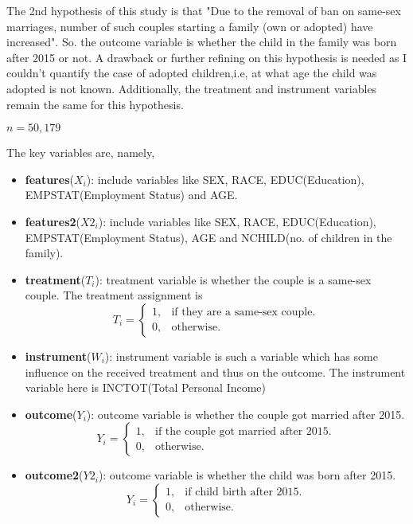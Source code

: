 \documentclass[11pt, a4paper, leqno]{article}
\begin{document}
The 2nd hypothesis of this study is that "Due to the removal of ban on same-sex marriages, number of such couples starting a family (own or 
adopted) have increased". So. the outcome variable is whether the child in the family was born after 2015 or not. A drawback or further refining 
on this hypothesis is needed as I couldn't quantify the case of adopted children,i.e, at what age the child was adopted is not known.
Additionally, the treatment and instrument variables remain the same for this hypothesis.

$n = 50,179$ 

The key variables are, namely,
\begin{itemize}
    \item \textbf{features}($X_i$): include variables like SEX, RACE, EDUC(Education), EMPSTAT(Employment Status) and AGE.
    \item \textbf{features2}($X2_i$): include variables like SEX, RACE, EDUC(Education), EMPSTAT(Employment Status), AGE and 
                                    NCHILD(no. of children in the family).
    \item \textbf{treatment}($T_i$): treatment variable is whether the couple is a same-sex couple. The treatment assignment is
     \[T_i=\begin{cases}
               1, & \text{if they are a same-sex couple}.\\
               0, & \text{otherwise}.
                   \end{cases}\]
    \item \textbf{instrument}($W_i$): instrument variable is such a variable which has some influence on the received treatment and thus on 
                                    the outcome. The instrument variable here is INCTOT(Total Personal Income)
    \item \textbf{outcome}($Y_i$): outcome variable is whether the couple got married after 2015. 
     \[Y_i=\begin{cases}
               1, & \text{if the couple got married after 2015}.\\
               0, & \text{otherwise}.
                   \end{cases}\]
    \item \textbf{outcome2}($Y2_i$): outcome variable is whether the child was born after 2015. 
     \[Y_i=\begin{cases}
               1, & \text{if child birth after 2015}.\\
               0, & \text{otherwise}.
                   \end{cases}\]
\end{itemize}
\end{document}
